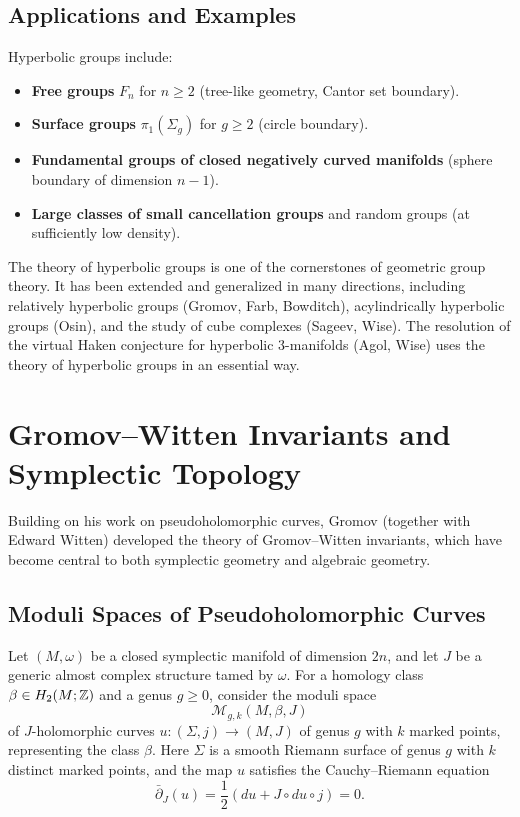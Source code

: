 \subsection{Applications and Examples}

Hyperbolic groups include:
\begin{itemize}
    \item \textbf{Free groups} \(F_n\) for \(n \geq 2\) (tree-like geometry, Cantor set boundary).
    \item \textbf{Surface groups} \(\pi_1(\Sigma_g)\) for \(g \geq 2\) (circle boundary).
    \item \textbf{Fundamental groups of closed negatively curved manifolds} (sphere boundary of dimension \(n-1\)).
    \item \textbf{Large classes of small cancellation groups} and random groups (at sufficiently low density).
\end{itemize}

The theory of hyperbolic groups is one of the cornerstones of geometric group theory. It has been extended and generalized in many directions, including relatively hyperbolic groups (Gromov, Farb, Bowditch), acylindrically hyperbolic groups (Osin), and the study of cube complexes (Sageev, Wise). The resolution of the virtual Haken conjecture for hyperbolic 3-manifolds (Agol, Wise) uses the theory of hyperbolic groups in an essential way.

\section{Gromov--Witten Invariants and Symplectic Topology}

Building on his work on pseudoholomorphic curves, Gromov (together with Edward Witten) developed the theory of Gromov--Witten invariants, which have become central to both symplectic geometry and algebraic geometry.

\subsection{Moduli Spaces of Pseudoholomorphic Curves}

Let \((M, \omega)\) be a closed symplectic manifold of dimension \(2n\), and let \(J\) be a generic almost complex structure tamed by \(\omega\). For a homology class \(\beta \in H_2(M; \mathbb{Z})\) and a genus \(g \geq 0\), consider the moduli space
\[
\mathcal{M}_{g, k}(M, \beta, J)
\]
of \(J\)-holomorphic curves \(u: (\Sigma, j) \to (M, J)\) of genus \(g\) with \(k\) marked points, representing the class \(\beta\). Here \(\Sigma\) is a smooth Riemann surface of genus \(g\) with \(k\) distinct marked points, and the map \(u\) satisfies the Cauchy--Riemann equation
\[
\bar\partial_J(u) = \frac{1}{2}(du + J \circ du \circ j) = 0.
\]

